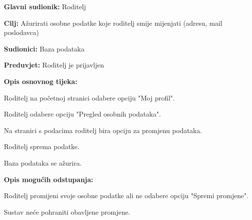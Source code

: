					\noindent {}
					\begin{packed_item}
						
						\item \textbf{Glavni sudionik: }Roditelj
						\item  \textbf{Cilj:} Ažurirati osobne podatke koje roditelj smije mijenjati (adresu, mail poslodavca)
						\item  \textbf{Sudionici:} Baza podataka
						\item  \textbf{Preduvjet:} Roditelj je prijavljen
						\item  \textbf{Opis osnovnog tijeka:}
						
						\item[] \begin{packed_enum}
							
							\item Roditelj na početnoj stranici odabere opciju "Moj profil". 
							\item Roditelj odabere opciju "Pregled osobnih podataka".
							\item Na stranici s podacima roditelj bira opciju za promjenu podataka.
							\item Roditelj sprema podatke.
							\item Baza podataka se ažurira.
						\end{packed_enum}
						
						\item  \textbf{Opis mogućih odstupanja:}
						
						\item[] \begin{packed_item}
							
							\item[4.a] Roditelj promijeni svoje osobne podatke ali ne odabere opciju "Spremi promjene".
							\item[] \begin{packed_enum}
								
								\item Sustav neće pohraniti obavljene promjene.
							\end{packed_enum}
							
						\end{packed_item}
					\end{packed_item}
					
